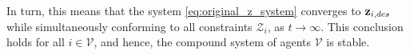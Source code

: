 In turn, this means that the system \eqref{eq:original_z_system} converges
to $\bm{\mathbf{z}}_{i,des}$ while simultaneously conforming to
all constraints $\mathcal{Z}_i$, as $t \to \infty$. This conclusion holds
for all $i \in \mathcal{V}$, and hence, the compound system of agents
$\mathcal{V}$ is stable.
\qedsymbol



